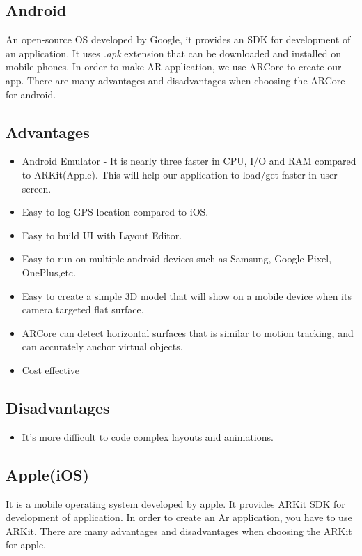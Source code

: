 \subsection{Android}
An open-source OS developed by Google, it provides an SDK for development of an application. It uses \textit{.apk} extension that can be downloaded and installed on mobile phones. In order to make AR application, we use ARCore to create our app. There are many advantages and disadvantages when choosing the ARCore for android.

\subsection{Advantages}
\begin{itemize}
  \item Android Emulator - It is nearly three faster in CPU, I/O and RAM compared to ARKit(Apple). This will help our application to load/get faster in user screen. 
  \item Easy to log GPS location compared to iOS.
  \item Easy to build UI with Layout Editor.
  \item Easy to run on multiple android devices such as Samsung, Google Pixel, OnePlus,etc.
  \item Easy to create a simple 3D model that will show on a mobile device when its camera targeted flat surface.
  \item ARCore can detect horizontal surfaces that is similar to motion tracking, and can accurately anchor virtual objects.
  \item Cost effective
\end{itemize}

\subsection{Disadvantages}
\begin{itemize}
    \item It's more difficult to code complex layouts and animations.
\end{itemize}

\subsection{Apple(iOS)}
It is a mobile operating system developed by apple. It provides ARKit SDK for development of application. In order to create an Ar application, you have to use ARKit. There are many advantages and disadvantages when choosing the ARKit for apple.

